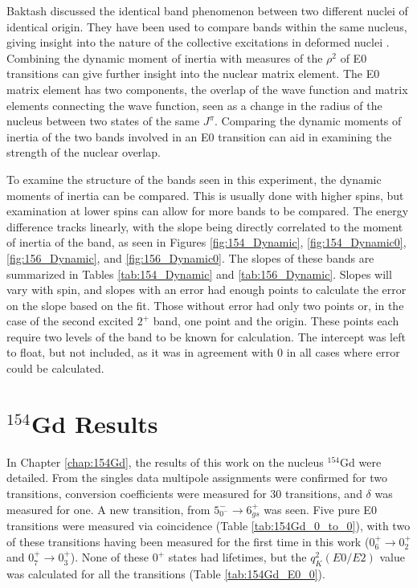 Baktash discussed the identical band phenomenon between two different nuclei of identical origin. They have been used to compare bands within the same nucleus, giving insight into the nature of the collective excitations in deformed nuclei \citep{aprahamian18:_156gd}. Combining the dynamic moment of inertia with measures of the $\rho^2$ of E0 transitions can give further insight into the nuclear matrix element. The E0 matrix element has two components, the overlap of the wave function and matrix elements connecting the wave function, seen as a change in the radius of the nucleus between two states of the same $J^{\pi}$. Comparing the dynamic moments of inertia of the two bands involved in an E0 transition can aid in examining the strength of the nuclear overlap.

To examine the structure of the bands seen in this experiment, the dynamic moments of inertia can be compared. This is usually done with higher spins, but examination at lower spins can allow for more bands to be compared. The energy difference tracks linearly, with the slope being directly correlated to the moment of inertia of the band, as seen in Figures \ref{fig:154_Dynamic}, \ref{fig:154_Dynamic0}, \ref{fig:156_Dynamic}, and \ref{fig:156_Dynamic0}. The slopes of these bands are summarized in Tables \ref{tab:154_Dynamic} and \ref{tab:156_Dynamic}. Slopes will vary with spin, and slopes with an error had enough points to calculate the error on the slope based on the fit. Those without error had only two points or, in the case of the second excited $2^+$ band, one point and the origin. These points each require two levels of the band to be known for calculation. The intercept was left to float, but not included, as it was in agreement with 0 in all cases where error could be calculated.

\section{$^{154}$Gd Results}
\label{sec:154_Discussion}
In Chapter \ref{chap:154Gd}, the results of this work on the nucleus $^{154}$Gd were detailed. From the singles data multipole assignments were confirmed for two transitions, conversion coefficients were measured for 30 transitions, and $\delta$ was measured for one. A new transition, from $5^-_{0^-}\rightarrow 6^+_{gs}$ was seen. Five pure E0 transitions were measured via coincidence (Table \ref{tab:154Gd_0_to_0}), with two of these transitions having been measured for the first time in this work ($0^+_6\rightarrow 0^+_2$ and $0^+_7\rightarrow 0^+_3$). None of these $0^+$ states had lifetimes, but the $q_K^2(E0/E2)$ value was calculated for all the transitions (Table \ref{tab:154Gd_E0_0}).

